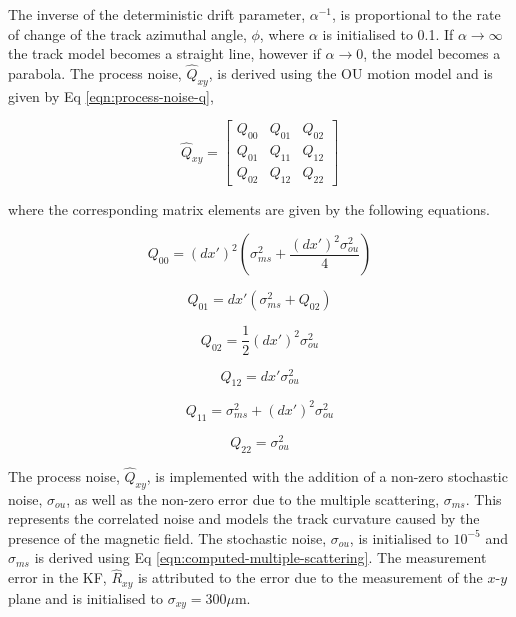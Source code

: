 The inverse of the deterministic drift parameter, $\alpha^{-1}$, is proportional to the rate of change of the track azimuthal angle, $\phi$, where $\alpha$ is initialised to 0.1. If $\alpha \rightarrow \infty$ the track model becomes a straight line, however if $\alpha \rightarrow 0$, the model becomes a parabola. The process noise, $\hat{Q}_{xy}$, is derived using the OU motion model \cite{OU} and is given by Eq \eqref{eqn:process-noise-q}, 
 
\begin{equation}
\hat{Q}_{xy} = \begin{bmatrix} Q_{00} & Q_{01} & Q_{02} \\  Q_{01} & Q_{11} & Q_{12} \\ Q_{02} & Q_{12} & Q_{22} \end{bmatrix} 
\label{eqn:process-noise-q}
\end{equation}

where the corresponding matrix elements are given by the following equations.

\begin{equation}
Q_{00} = (dx')^{2} (\sigma_{ms}^{2} + \frac{(dx')^{2} \sigma_{ou}^{2}}{4})
\label{eqn:q00}
\end{equation}


\begin{equation}
Q_{01} = dx'( \sigma_{ms}^2 + Q_{02} )
\label{eqn:q01}
\end{equation}

\begin{equation}
Q_{02} = \frac{1}{2} (dx')^2 \sigma_{ou}^{2}
\label{eqn:q02}
\end{equation}

\begin{equation}
Q_{12} = dx' \sigma_{ou}^{2}
\label{eqn:q12}
\end{equation}

\begin{equation}
Q_{11} = \sigma_{ms}^2 + (dx')^{2} \sigma_{ou}^{2}
\label{eqn:q22}
\end{equation}

\begin{equation}
Q_{22} = \sigma_{ou}^2
\label{eqn:q22}
\end{equation}

The process noise, $\hat{Q}_{xy}$, is implemented with the addition of a non-zero stochastic noise, $\sigma_{ou}$, as well as the non-zero error due to the multiple scattering, $\sigma_{ms}$. This represents the correlated noise and models the track curvature caused by the presence of the magnetic field. The stochastic noise, $\sigma_{ou}$, is initialised to $10^{-5}$ and $\sigma_{ms}$ is derived using Eq \eqref{eqn:computed-multiple-scattering}. The measurement error in the KF, $\hat{R}_{xy}$ is attributed to the error due to the measurement of the $x$-$y$ plane and is initialised to $\sigma_{xy} = 300\mu$m.















